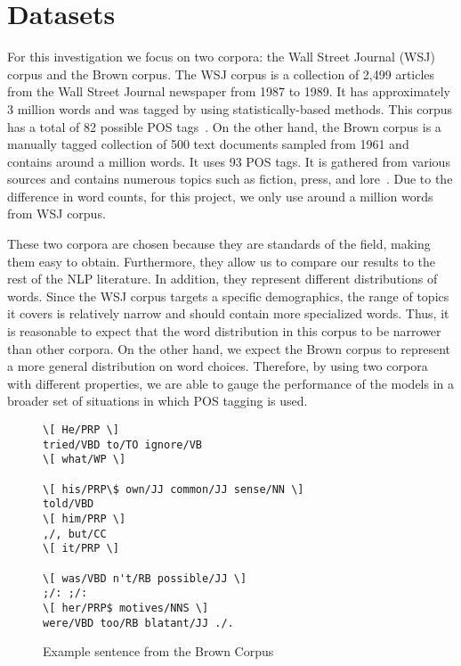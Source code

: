 \section{Datasets}
\label{sec:datasets}
For this investigation we focus on two corpora: the Wall Street Journal (WSJ) corpus and the Brown corpus. The WSJ corpus is a collection of 2,499 articles from the Wall Street Journal newspaper from 1987 to 1989. It has approximately 3 million words and was tagged by using statistically-based methods. This corpus has a total of 82 possible POS tags~\cite{wsjCorpus}. On the other hand, the Brown corpus is a manually tagged collection of 500 text documents sampled from 1961 and contains around a million words. It uses 93 POS tags. It is gathered from various sources and contains numerous topics such as fiction, press, and lore~\cite{brownCorpus}. Due to the difference in word counts, for this project, we only use around a million words from WSJ corpus.

These two corpora are chosen because they are standards of the field, making them easy to obtain. Furthermore, they allow us to compare our results to the rest of the NLP literature. In addition, they represent different distributions of words. Since the WSJ corpus targets a specific demographics, the range of topics it covers is relatively narrow and should contain more specialized words. Thus, it is reasonable to expect that the word distribution in this corpus to be narrower than other corpora. On the other hand, we expect the Brown corpus to represent a more general distribution on word choices. Therefore, by using two corpora with different properties, we are able to gauge the performance of the models in a broader set of situations in which POS tagging is used.

\begin{figure}[ht]
 \begin{Verbatim}[frame=single,framesep=5mm]
\[ He/PRP \]
tried/VBD to/TO ignore/VB
\[ what/WP \]

\[ his/PRP\$ own/JJ common/JJ sense/NN \]
told/VBD
\[ him/PRP \]
,/, but/CC
\[ it/PRP \]

\[ was/VBD n't/RB possible/JJ \]
;/: ;/:
\[ her/PRP$ motives/NNS \]
were/VBD too/RB blatant/JJ ./.
\end{Verbatim}
\caption{Example sentence from the Brown Corpus~\cite{brownCorpus} \label{brownExample}}
\end{figure}
